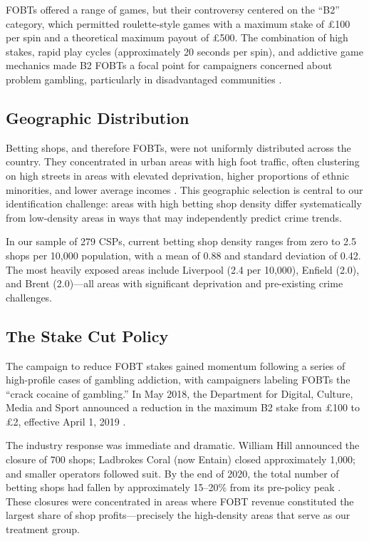 \documentclass[12pt]{article}
\begin{document}
FOBTs offered a range of games, but their controversy centered on the ``B2'' category, which permitted roulette-style games with a maximum stake of \pounds100 per spin and a theoretical maximum payout of \pounds500. The combination of high stakes, rapid play cycles (approximately 20 seconds per spin), and addictive game mechanics made B2 FOBTs a focal point for campaigners concerned about problem gambling, particularly in disadvantaged communities \citep{wardle2014}.

\subsection{Geographic Distribution}

Betting shops, and therefore FOBTs, were not uniformly distributed across the country. They concentrated in urban areas with high foot traffic, often clustering on high streets in areas with elevated deprivation, higher proportions of ethnic minorities, and lower average incomes \citep{astbury2008, wardle2014}. This geographic selection is central to our identification challenge: areas with high betting shop density differ systematically from low-density areas in ways that may independently predict crime trends.

In our sample of 279 CSPs, current betting shop density ranges from zero to 2.5 shops per 10,000 population, with a mean of 0.88 and standard deviation of 0.42. The most heavily exposed areas include Liverpool (2.4 per 10,000), Enfield (2.0), and Brent (2.0)---all areas with significant deprivation and pre-existing crime challenges.

\subsection{The Stake Cut Policy}

The campaign to reduce FOBT stakes gained momentum following a series of high-profile cases of gambling addiction, with campaigners labeling FOBTs the ``crack cocaine of gambling.'' In May 2018, the Department for Digital, Culture, Media and Sport announced a reduction in the maximum B2 stake from \pounds100 to \pounds2, effective April 1, 2019 \citep{dcms2018review}.

The industry response was immediate and dramatic. William Hill announced the closure of 700 shops; Ladbrokes Coral (now Entain) closed approximately 1,000; and smaller operators followed suit. By the end of 2020, the total number of betting shops had fallen by approximately 15--20\% from its pre-policy peak \citep{gamblingcommission2020}. These closures were concentrated in areas where FOBT revenue constituted the largest share of shop profits---precisely the high-density areas that serve as our treatment group.
\end{document}
